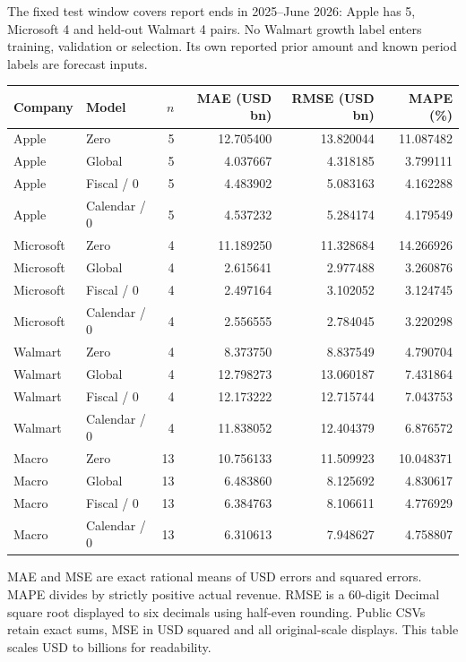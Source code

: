 \documentclass[11pt,letterpaper]{article}
\newcommand{\heading}[1]{\vspace{4pt}{\large\bfseries #1}\par}
\newcommand{\BoundQ}{5}
\newcommand{\BoundR}{4}
\newcommand{\BoundS}{4}
\newcommand{\BoundT}{5}
\newcommand{\BoundU}{12.705400}
\newcommand{\BoundV}{13.820044}
\newcommand{\BoundW}{11.087482}
\newcommand{\BoundX}{5}
\newcommand{\BoundY}{4.037667}
\newcommand{\BoundZ}{4.318185}
\newcommand{\BoundAA}{3.799111}
\newcommand{\BoundAB}{5}
\newcommand{\BoundAC}{4.483902}
\newcommand{\BoundAD}{5.083163}
\newcommand{\BoundAE}{4.162288}
\newcommand{\BoundAF}{5}
\newcommand{\BoundAG}{4.537232}
\newcommand{\BoundAH}{5.284174}
\newcommand{\BoundAI}{4.179549}
\newcommand{\BoundAJ}{4}
\newcommand{\BoundAK}{11.189250}
\newcommand{\BoundAL}{11.328684}
\newcommand{\BoundAM}{14.266926}
\newcommand{\BoundAN}{4}
\newcommand{\BoundAO}{2.615641}
\newcommand{\BoundAP}{2.977488}
\newcommand{\BoundAQ}{3.260876}
\newcommand{\BoundAR}{4}
\newcommand{\BoundAS}{2.497164}
\newcommand{\BoundAT}{3.102052}
\newcommand{\BoundAU}{3.124745}
\newcommand{\BoundAV}{4}
\newcommand{\BoundAW}{2.556555}
\newcommand{\BoundAX}{2.784045}
\newcommand{\BoundAY}{3.220298}
\newcommand{\BoundAZ}{4}
\newcommand{\BoundBA}{8.373750}
\newcommand{\BoundBB}{8.837549}
\newcommand{\BoundBC}{4.790704}
\newcommand{\BoundBD}{4}
\newcommand{\BoundBE}{12.798273}
\newcommand{\BoundBF}{13.060187}
\newcommand{\BoundBG}{7.431864}
\newcommand{\BoundBH}{4}
\newcommand{\BoundBI}{12.173222}
\newcommand{\BoundBJ}{12.715744}
\newcommand{\BoundBK}{7.043753}
\newcommand{\BoundBL}{4}
\newcommand{\BoundBM}{11.838052}
\newcommand{\BoundBN}{12.404379}
\newcommand{\BoundBO}{6.876572}
\newcommand{\BoundBP}{13}
\newcommand{\BoundBQ}{10.756133}
\newcommand{\BoundBR}{11.509923}
\newcommand{\BoundBS}{10.048371}
\newcommand{\BoundBT}{13}
\newcommand{\BoundBU}{6.483860}
\newcommand{\BoundBV}{8.125692}
\newcommand{\BoundBW}{4.830617}
\newcommand{\BoundBX}{13}
\newcommand{\BoundBY}{6.384763}
\newcommand{\BoundBZ}{8.106611}
\newcommand{\BoundCA}{4.776929}
\newcommand{\BoundCB}{13}
\newcommand{\BoundCC}{6.310613}
\newcommand{\BoundCD}{7.948627}
\newcommand{\BoundCE}{4.758807}
\begin{document}
\newpage
\heading{All protected-test company and macro results}
The fixed test window covers report ends in 2025--June 2026: Apple has \BoundQ{}, Microsoft \BoundR{} and held-out Walmart \BoundS{} pairs. No Walmart growth label enters training, validation or selection. Its own reported prior amount and known period labels are forecast inputs.

\begin{center}\small\begin{tabular}{llrrrr}\toprule
Company & Model & $n$ & MAE (USD bn) & RMSE (USD bn) & MAPE (\%)\\\midrule
Apple & Zero & \BoundT{} & \BoundU{} & \BoundV{} & \BoundW{}\\
Apple & Global & \BoundX{} & \BoundY{} & \BoundZ{} & \BoundAA{}\\
Apple & Fiscal / 0 & \BoundAB{} & \BoundAC{} & \BoundAD{} & \BoundAE{}\\
Apple & Calendar / 0 & \BoundAF{} & \BoundAG{} & \BoundAH{} & \BoundAI{}\\
\midrule
Microsoft & Zero & \BoundAJ{} & \BoundAK{} & \BoundAL{} & \BoundAM{}\\
Microsoft & Global & \BoundAN{} & \BoundAO{} & \BoundAP{} & \BoundAQ{}\\
Microsoft & Fiscal / 0 & \BoundAR{} & \BoundAS{} & \BoundAT{} & \BoundAU{}\\
Microsoft & Calendar / 0 & \BoundAV{} & \BoundAW{} & \BoundAX{} & \BoundAY{}\\
\midrule
Walmart & Zero & \BoundAZ{} & \BoundBA{} & \BoundBB{} & \BoundBC{}\\
Walmart & Global & \BoundBD{} & \BoundBE{} & \BoundBF{} & \BoundBG{}\\
Walmart & Fiscal / 0 & \BoundBH{} & \BoundBI{} & \BoundBJ{} & \BoundBK{}\\
Walmart & Calendar / 0 & \BoundBL{} & \BoundBM{} & \BoundBN{} & \BoundBO{}\\
\midrule
Macro & Zero & \BoundBP{} & \BoundBQ{} & \BoundBR{} & \BoundBS{}\\
Macro & Global & \BoundBT{} & \BoundBU{} & \BoundBV{} & \BoundBW{}\\
Macro & Fiscal / 0 & \BoundBX{} & \BoundBY{} & \BoundBZ{} & \BoundCA{}\\
Macro & Calendar / 0 & \BoundCB{} & \BoundCC{} & \BoundCD{} & \BoundCE{}\\
\bottomrule\end{tabular}\end{center}
MAE and MSE are exact rational means of USD errors and squared errors. MAPE divides by strictly positive actual revenue. RMSE is a 60-digit Decimal square root displayed to six decimals using half-even rounding. Public CSVs retain exact sums, MSE in USD squared and all original-scale displays. This table scales USD to billions for readability.
\end{document}
